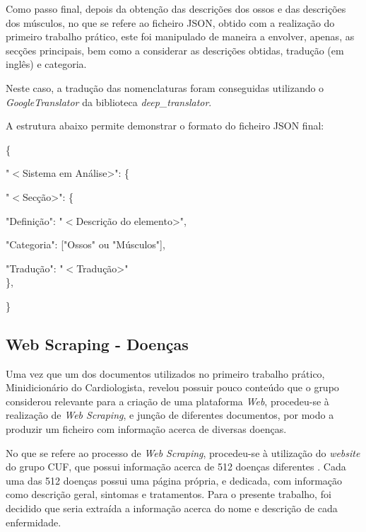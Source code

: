 Como passo final, depois da obtenção das descrições dos ossos e das descrições dos músculos, no que se refere ao ficheiro JSON, obtido com a realização do primeiro trabalho prático, este foi manipulado de maneira a envolver, apenas, as secções principais, bem como a considerar as descrições obtidas, tradução (em inglês) e categoria. 

Neste caso, a tradução das nomenclaturas foram conseguidas utilizando o \textit{GoogleTranslator} da biblioteca \textit{deep\_translator}. 

A estrutura abaixo permite demonstrar o formato do ficheiro JSON final:

\begin{center}
    \{\\
\end{center}
\begin{center}
    "\(<\)Sistema em Análise>": \{ \\
\end{center}
\begin{center}
        "\(<\)Secção>": \{
\end{center}
\begin{center}
        "Definição": "\(<\)Descrição do elemento>",\\
\end{center}
\begin{center}
        "Categoria": ["Ossos" ou "Músculos"],\\
\end{center}
\begin{center}
        "Tradução": "\(<\)Tradução>"\\
    \},\\
\end{center}
\begin{center}
\}
\end{center}

\subsection{Web Scraping - Doenças}

Uma vez que um dos documentos utilizados no primeiro trabalho prático, Minidicionário do Cardiologista, revelou possuir pouco conteúdo que o grupo considerou relevante para a criação de uma plataforma \textit{Web}, procedeu-se à realização de \textit{Web Scraping}, e junção de diferentes documentos, por modo a produzir um ficheiro com informação acerca de diversas doenças.

No que se refere ao processo de \textit{Web Scraping}, procedeu-se à utilização do \textit{website} do grupo CUF, que possui informação acerca de 512 doenças diferentes \cite{cuf2024}. Cada uma das 512 doenças possui uma página própria, e dedicada, com informação como descrição geral, sintomas e tratamentos. Para o presente trabalho, foi decidido que seria extraída a informação acerca do nome e descrição de cada enfermidade.

